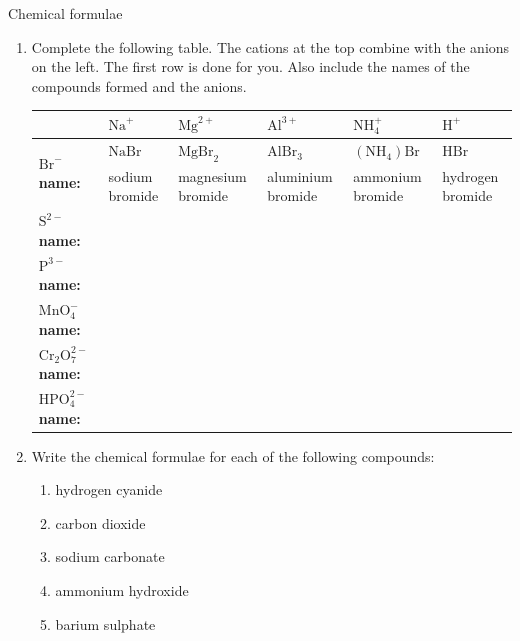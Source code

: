             \begin{exercises}{Chemical formulae
        }
            \nopagebreak
        \label{m38689*id145052}\begin{enumerate}[noitemsep, label=\textbf{\arabic*}. ] 
            \label{m38689*uid100}\item 
Complete the following table. The cations at the top combine with the anions on the left. The first row is done for you. Also include the names of the compounds formed and the anions.
          \begin{table}[H]
        \begin{center}
      \label{m38689*id145067}
    \noindent
      \begin{tabular}{|p{1cm}|p{1.5cm}|p{2cm}|p{2cm}|p{2cm}|p{2cm}|}\hline
        &\textbf{ $\text{Na}^{+}$} & \textbf{$\text{Mg}^{2+}$} & \textbf{$\text{Al}^{3+}$} & \textbf{$\text{NH}_{4}^{+}$} & \textbf{$\text{H}^{+}$} \\ \hline
\multirow{2}{1cm}{\textbf{$\text{Br}^{-}$ name:}} & $\text{NaBr}$  & $\text{MgBr}_2$  & $\text{AlBr}_3$  & $(\text{NH}_{4})\text{Br}$  & $\text{HBr}$  \\ 
 & sodium bromide & magnesium bromide & aluminium bromide & ammonium bromide & hydrogen bromide \\ \hline
\textbf{$\text{S}^{2-}$ name:} & & & & & \\ \hline
\textbf{$\text{P}^{3-}$ name:} & & & & & \\ \hline
\textbf{$\text{MnO}_{4}^{-}$ name:} & & & & & \\ \hline
\textbf{$\text{Cr}_{2}\text{O}_{7}^{2-}$ name:} & & & & & \\ \hline
\textbf{$\text{HPO}_{4}^{2-}$ name:} & & & & & \\ \hline
    \end{tabular}
      \end{center}
\end{table}
    \par
\item Write the chemical formulae for each of the following compounds:
  \begin{enumerate}[noitemsep, label=\textbf{\alph*}. ] 
    \item hydrogen cyanide
    \item carbon dioxide
    \item sodium carbonate
    \item ammonium hydroxide
    \item barium sulphate

\end{enumerate}
\end{enumerate}
\end{exercises}
